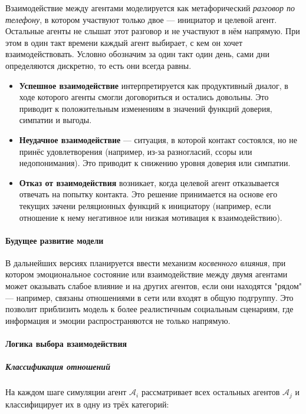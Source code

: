 \documentclass[12pt]{article}
\begin{document}
Взаимодействие между агентами моделируется как метафорический \emph{разговор по телефону}, в котором участвуют только двое — инициатор и целевой агент. Остальные агенты не слышат этот разговор и не участвуют в нём напрямую. При этом в один такт времени каждый агент выбирает, с кем он хочет взаимодействовать. Условно обозначим за один такт один день, сами дни определяются дискретно, то есть они всегда равны.

\begin{itemize}
    \item \textbf{Успешное взаимодействие} интерпретируется как продуктивный диалог, в ходе которого агенты смогли договориться и остались довольны. Это приводит к положительным изменениям в значений функций доверия, симпатии и выгоды.
    \item \textbf{Неудачное взаимодействие} — ситуация, в которой контакт состоялся, но не принёс удовлетворения (например, из-за разногласий, ссоры или недопонимания). Это приводит к снижению уровня доверия или симпатии.
    \item \textbf{Отказ от взаимодействия} возникает, когда целевой агент отказывается отвечать на попытку контакта. Это решение принимается на основе его текущих зачени реляционных функций к инициатору (например, если отношение к нему негативное или низкая мотивация к взаимодействию).
\end{itemize}

\paragraph{Будущее развитие модели}

В дальнейших версиях планируется ввести механизм \emph{косвенного влияния}, при котором эмоциональное состояние или взаимодействие между двумя агентами может оказывать слабое влияние и на других агентов, если они находятся "рядом" — например, связаны отношениями в сети или входят в общую подгруппу. Это позволит приблизить модель к более реалистичным социальным сценариям, где информация и эмоции распространяются не только напрямую.

\paragraph{Логика выбора взаимодействия}

\subparagraph{Классификация отношений}

На каждом шаге симуляции агент \( \mathcal{A}_i \) рассматривает всех остальных агентов \( \mathcal{A}_j \) и классифицирует их в одну из трёх категорий:
\end{document}
